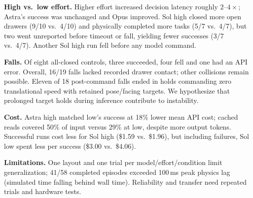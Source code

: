 \documentclass{article}
\begin{document}
\textbf{High vs.\ low effort.} Higher effort increased decision latency roughly
$2$--$4\times$; Astra's success was unchanged and Opus improved. Sol high closed
more open drawers (9/10 vs.\ 4/10) and physically completed more tasks (5/7 vs.\ 4/7),
but two went unreported before timeout or fall, yielding fewer successes
(3/7 vs.\ 4/7). Another Sol high run fell before any model command.

\textbf{Falls.} Of eight all-closed controls, three succeeded, four fell and one
had an API error. Overall, 16/19 falls lacked recorded drawer contact; other
collisions remain possible. Eleven of 18 post-command falls ended in holds
commanding zero translational speed with retained pose/facing targets. We hypothesize that prolonged target holds
during inference contribute to instability.

\textbf{Cost.} Astra high matched low's success at 18\% lower mean API cost; cached reads
covered 50\% of input versus 29\% at low, despite more output tokens.
Successful runs cost less for Sol high (\$1.59 vs.\ \$1.96), but including failures,
Sol low spent less per success (\$3.00 vs.\ \$4.06).

\textbf{Limitations.} One layout and one trial per model/effort/condition limit
generalization; 41/58 completed episodes exceeded 100\,ms peak physics lag
(simulated time falling behind wall time).
Reliability and transfer need repeated trials and hardware tests.

\clearpage

\end{document}
